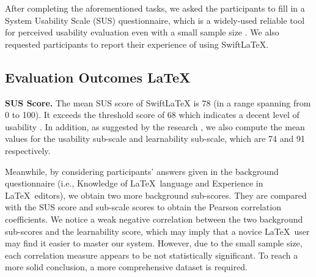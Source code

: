 \documentclass[sigconf]{acmart}
\begin{document}
After completing the aforementioned tasks, we asked the participants to fill in a System Usability Scale (SUS) questionnaire, which is a widely-used reliable tool for perceived usability evaluation even with a small sample size \cite{brooke1996sus}.
We also requested participants to report their experience of using SwiftLaTeX.

\subsection{Evaluation Outcomes \LaTeX{}}


\textbf{SUS Score.}
The mean SUS score of SwiftLaTeX is 78 (in a range spanning from 0 to 100). It exceeds the threshold score of 68 which  indicates a decent level of usability \cite{brooke1996sus}. 
In addition, as suggested by the research \cite{lewis2009factor}, we also compute the mean values for the usability sub-scale and learnability sub-scale, which are 74 and 91 respectively. 

Meanwhile, by considering participants' answers given in the background questionnaire (i.e., Knowledge of \LaTeX\ language and Experience in \LaTeX\ editors), we obtain two more background sub-scores.
They are compared with the SUS score and sub-scale scores to obtain the Pearson correlation coefficients. 
We notice a weak negative correlation between the two background sub-scores and the learnability score, which may imply that a novice \LaTeX\ user may find it easier to master our system.
However, due to the small sample size, each correlation measure appears to be not statistically significant. To reach a more solid conclusion, a more comprehensive dataset is required.
\end{document}
